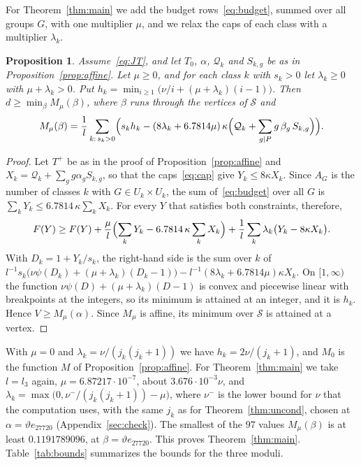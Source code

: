 \documentclass[11pt]{amsart}
\newtheorem{proposition}[theorem]{Proposition}
\theoremstyle{definition}
\theoremstyle{remark}
\numberwithin{equation}{section}
\newcommand{\DcertG}{0.1191789096}
\newcommand{\Lich}{6.7814}
\begin{document}
For Theorem~\ref{thm:main} we add the budget rows~\eqref{eq:budget}, summed over all groups $G$, with one multiplier $\mu$, and we relax the caps of each class with a multiplier $\lambda_k$.

\begin{proposition}\label{prop:cond}
Assume~\eqref{eq:JT}, and let $T_0$, $\alpha$, $\mathcal Q_k$ and $S_{k,g}$ be as in Proposition~\ref{prop:affine}. Let $\mu\ge0$, and for each class $k$ with $s_k>0$ let $\lambda_k\ge0$ with $\mu+\lambda_k>0$. Put $h_k=\min_{i\ge1}\bigl(\nu/i+(\mu+\lambda_k)(i-1)\bigr)$. Then $d\ge\min_\beta M_\mu(\beta)$, where $\beta$ runs through the vertices of $\mathcal S$ and
\[
M_\mu(\beta)=\frac1l\sum_{k:\,s_k>0}\Bigl(s_kh_k-(8\lambda_k+\Lich\mu)\,\kappa\Bigl(\mathcal Q_k+\sum_{g\mid P}g\,\beta_g\,S_{k,g}\Bigr)\Bigr).
\]
\end{proposition}

\begin{proof}
Let $T^+$ be as in the proof of Proposition~\ref{prop:affine} and $X_k=\mathcal Q_k+\sum_gg\alpha_gS_{k,g}$, so that the caps~\eqref{eq:cap} give $Y_k\le8\kappa X_k$. Since $A_G$ is the number of classes $k$ with $G\in U_k\times U_k$, the sum of~\eqref{eq:budget} over all $G$ is $\sum_kY_k\le\Lich\,\kappa\sum_kX_k$. For every $Y$ that satisfies both constraints, therefore,
\[
F(Y)\ge F(Y)+\frac\mu l\Bigl(\sum_kY_k-\Lich\,\kappa\sum_kX_k\Bigr)+\frac1l\sum_k\lambda_k\bigl(Y_k-8\kappa X_k\bigr).
\]
With $D_k=1+Y_k/s_k$, the right-hand side is the sum over $k$ of $l^{-1}s_k\bigl(\nu\psi(D_k)+(\mu+\lambda_k)(D_k-1)\bigr)-l^{-1}(8\lambda_k+\Lich\mu)\kappa X_k$. On $[1,\infty)$ the function $\nu\psi(D)+(\mu+\lambda_k)(D-1)$ is convex and piecewise linear with breakpoints at the integers, so its minimum is attained at an integer, and it is $h_k$. Hence $V\ge M_\mu(\alpha)$. Since $M_\mu$ is affine, its minimum over $\mathcal S$ is attained at a vertex.
\end{proof}

With $\mu=0$ and $\lambda_k=\nu/(j_k(j_k+1))$ we have $h_k=2\nu/(j_k+1)$, and $M_0$ is the function $M$ of Proposition~\ref{prop:affine}. For Theorem~\ref{thm:main} we take $l=l_3$ again, $\mu=6.87217\cdot10^{-7}$, about $3.676\cdot10^{-3}\nu$, and $\lambda_k=\max\bigl(0,\nu^-/(j_k(j_k+1))-\mu\bigr)$, where $\nu^-$ is the lower bound for $\nu$ that the computation uses, with the same $j_k$ as for Theorem~\ref{thm:uncond}, chosen at $\alpha=\vartheta e_{27720}$ (Appendix~\ref{sec:check}). The smallest of the $97$ values $M_\mu(\beta)$ is at least $\DcertG$, at $\beta=\vartheta e_{27720}$. This proves Theorem~\ref{thm:main}. Table~\ref{tab:bounds} summarizes the bounds for the three moduli.
\end{document}
